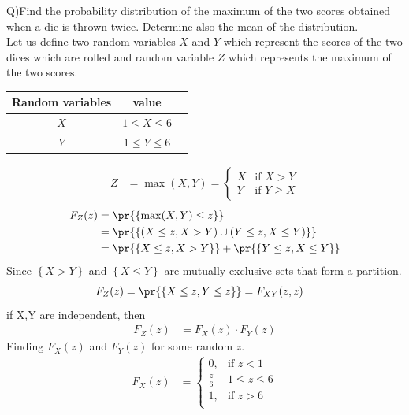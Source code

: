 \documentclass[journal,12pt,twocolumn]{IEEEtran}
\begin{document}
Q)Find the probability distribution of the maximum of the two scores obtained
when a die is thrown twice. Determine also the mean of the distribution.
\\
   \solution Let us define two random variables $X$ and $Y$ which represent the scores of the two dices which are rolled and random variable $Z$ which represents the maximum of the two scores.\\
\begin{table}[!ht]
\begin{tabular}{|c|c|c|}
	\hline
	\textbf{Random variables} & \textbf{value} \\
	\hline
	$X$ & $1 \leq X \leq 6$ \\
	\hline
	$Y$ & $1 \leq Y \leq 6$ \\
	\hline
\end{tabular}
\end{table} 
\begin{align}
Z &= \max(X, Y) \mathrel{=}
    \begin{cases}
    X & \text{if } X > Y \\
    Y & \text{if } Y \geq X
    \end{cases}
\end{align}
\begin{align}
F_Z(z) &= \pr{\{ \max(X, Y) \leq z \}} \\
&= \pr{\left\{ (X \leq z , X > Y) \cup (Y \leq z , X \leq Y) \right\}} \\
&= \pr{\{X \leq z, X > Y\}} + \pr{\{Y \leq z, X \leq Y\}}
\end{align}
Since $\left\{X > Y\right\}$ and $\left\{X \le Y\right\}$ are mutually exclusive sets that form a partition.
\begin{align}
F_Z(z) &= \pr{\{X \leq z, Y \leq z\}} \mathrel{=}
        F_{XY}(z, z)
\end{align}
if X,Y are independent, then
\begin{align}
F_Z(z) &= F_X(z) \cdot F_Y(z)
\end{align}
Finding $F_X(z)$ and $F_Y(z)$ for some random $z$.
\begin{align}
F_X(z) &=
    \begin{cases}
    0, & \text{if } z < 1 \\
    \frac{z}{6} & 1 \leq z \leq 6\\
    1, &  \text{if } z > 6 \\
    \end{cases}
\end{align}
\end{document}
